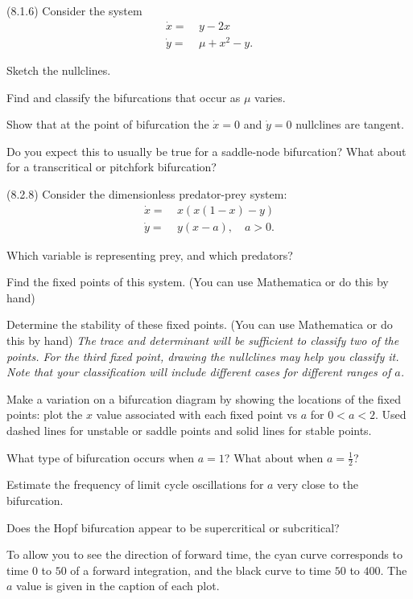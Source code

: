 \documentclass[12pt,letterpaper,noanswers]{exam}
\begin{document}
\begin{questions}
\question (8.1.6) Consider the system
\begin{align*}
\dot{x} = &\ y - 2x \\
\dot{y} = &\ \mu+x^2-y.
\end{align*}
\begin{parts}
\item Sketch the nullclines.
\item Find and classify the bifurcations that occur as $\mu$ varies.
\item Show that at the point of bifurcation the $\dot{x}=0$ and $\dot{y}=0$ nullclines are tangent.  
\item Do you expect this to usually be true for a saddle-node bifurcation?  What about for a transcritical or pitchfork bifurcation?
\end{parts}

\question (8.2.8) Consider the dimensionless predator-prey system:
\begin{align*}
\dot{x} = &\ x(x(1-x)-y) \\
\dot{y} = &\ y(x-a), \quad a>0.
\end{align*}
\begin{parts}
\item Which variable is representing prey, and which predators?
\item Find the fixed points of this system. (You can use Mathematica or do this by hand)
\item Determine the stability of these fixed points.  (You can use Mathematica or do this by hand)  \emph{The trace and determinant will be sufficient to classify two of the points.  For the third fixed point, drawing the nullclines may help you classify it.  Note that your classification will include different cases for different ranges of $a$.}
\item Make a variation on a bifurcation diagram by showing the locations of the fixed points: plot the $x$ value associated with each fixed point vs $a$ for $0 < a < 2$.  Used dashed lines for unstable or saddle points and solid lines for stable points.
\item What type of bifurcation occurs when $a=1$?  What about when $a = \frac{1}{2}$?
\item Estimate the frequency of limit cycle oscillations for $a$ very close to the bifurcation.
\item Does the Hopf bifurcation appear to be supercritical or subcritical?  

To allow you to see the direction of forward time, the cyan curve corresponds to time $0$ to $50$ of a forward integration, and the black curve to time $50$ to $400$.  The $a$ value is given in the caption of each plot.


\end{parts}
\end{questions}
\end{document}
